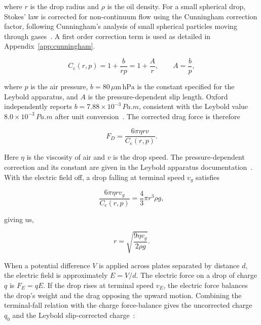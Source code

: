 \documentclass[12pt,a4paper]{article}
\begin{document}
where $r$ is the drop radius and $\rho$ is the oil density. For a small
spherical drop, Stokes' law is corrected for non-continuum flow using the
Cunningham correction factor, following Cunningham's analysis of small
spherical particles moving through gases~\cite{cunningham1910}. A first order correction term is used as detailed in Appendix~\ref{app:cunningham}.

\begin{equation}
    C_{\mathrm{c}}(r,p) = 1 + \frac{b}{rp}
    = 1 + \frac{A}{r},
    \qquad A=\frac{b}{p},
\end{equation}

where $p$ is the air pressure, $b=80\,\mu\mathrm{m\,hPa}$ is the constant
specified for the Leybold apparatus, and $A$ is the pressure-dependent slip
length. Oxford independently reports $b=7.88\times10^{-3}\,\si{Pa.m}$,
consistent with the Leybold value $8.0\times10^{-3}\,\si{Pa.m}$ after unit
conversion~\cite{oxfordMillikan}. The corrected drag force is therefore

\begin{equation}
    F_D = \frac{6\pi\eta r v}{C_{\mathrm{c}}(r,p)}.
\end{equation}

Here $\eta$ is the viscosity of air and $v$ is the drop speed. The
pressure-dependent correction and its constant are given in the Leybold
apparatus documentation~\cite{leybold559412,oxfordMillikan}. With the electric field off,
a drop falling at terminal speed $v_g$ satisfies

\begin{equation}
    \frac{6\pi\eta r v_g}{C_{\mathrm{c}}(r,p)}
    = \frac{4}{3}\pi r^3\rho g,
    \label{eq:terminal-fall}
\end{equation}

giving us,

\begin{equation}
    r=\sqrt{\frac{9\eta v_g}{2\rho g}}.
    \label{eq:radius}
\end{equation}

When a potential difference $V$ is applied across plates separated by distance
$d$, the electric field is approximately $E=V/d$. The electric force on a
drop of charge $q$ is $F_E=qE$. If the drop rises at terminal speed $v_E$,
the electric force balances the drop's weight and the drag opposing the
upward motion. Combining the terminal-fall relation with the charge
force-balance gives the uncorrected charge $q_0$ and the Leybold slip-corrected
charge~\cite{leybold559412}:
\end{document}
